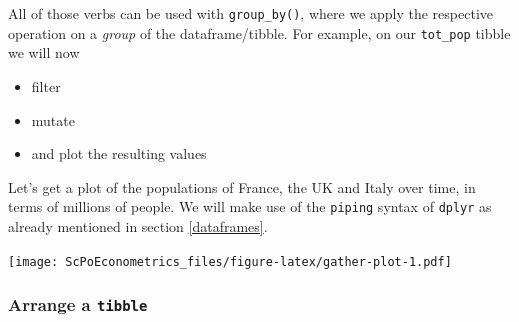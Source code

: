 \documentclass[]{book}
\newenvironment{Shaded}{\begin{snugshade}}{\end{snugshade}}
\newcommand{\KeywordTok}[1]{\textcolor[rgb]{0.13,0.29,0.53}{\textbf{#1}}}
\newcommand{\DataTypeTok}[1]{\textcolor[rgb]{0.13,0.29,0.53}{#1}}
\newcommand{\DecValTok}[1]{\textcolor[rgb]{0.00,0.00,0.81}{#1}}
\newcommand{\FloatTok}[1]{\textcolor[rgb]{0.00,0.00,0.81}{#1}}
\newcommand{\StringTok}[1]{\textcolor[rgb]{0.31,0.60,0.02}{#1}}
\newcommand{\CommentTok}[1]{\textcolor[rgb]{0.56,0.35,0.01}{\textit{#1}}}
\newcommand{\OperatorTok}[1]{\textcolor[rgb]{0.81,0.36,0.00}{\textbf{#1}}}
\newcommand{\NormalTok}[1]{#1}
\providecommand{\tightlist}{%
  \setlength{\itemsep}{0pt}\setlength{\parskip}{0pt}}
\theoremstyle{definition}
\theoremstyle{definition}
\theoremstyle{definition}
\theoremstyle{remark}
\begin{document}
All of those verbs can be used with \texttt{group\_by()}, where we apply
the respective operation on a \emph{group} of the dataframe/tibble. For
example, on our \texttt{tot\_pop} tibble we will now

\begin{itemize}
\tightlist
\item
  filter
\item
  mutate
\item
  and plot the resulting values
\end{itemize}

Let's get a plot of the populations of France, the UK and Italy over
time, in terms of millions of people. We will make use of the
\texttt{piping} syntax of \texttt{dplyr} as already mentioned in section
\ref{dataframes}.

\begin{Shaded}
\end{Shaded}

\texttt{[image: ScPoEconometrics\_files/figure-latex/gather-plot-1.pdf]}

\subsubsection*{\texorpdfstring{Arrange a
\texttt{tibble}}{Arrange a tibble}}\label{arrange-a-tibble}
\end{document}
